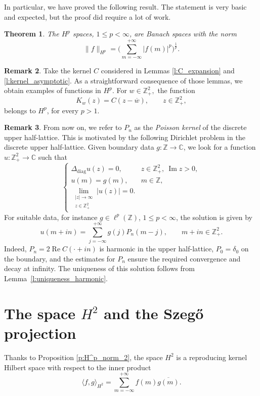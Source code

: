 \documentclass[12pt,a4paper,reqno]{amsart}
\newtheorem{thm}{Theorem}[section]
\theoremstyle{definition}
\newtheorem{rmk}[thm]{Remark}
\theoremstyle{definition}\newtheorem{defn}[thm]{Definition}
\begin{document}
    In particular, we have proved the following result. The statement is very basic and expected, but the proof did require a lot of work. 
    
    \begin{thm}\label{t:Hp_boundary_banach}
    The $H^p$ spaces, $1\leqslant p<\infty$,
    are Banach spaces with the norm
    \[
    \|f\|_{H^p}
    =
    \Big(\sum_{m=-\infty}^{+\infty}|f(m)|^p\Big)^{\frac 1p}.
    \]
    \end{thm}
    \begin{rmk}\label{Rmk:kernelsHp}
        Take the kernel $C$ considered in Lemmas \ref{l:C_expansion} and \ref{l:kernel_asymptotic}. As a straightforward consequence of those lemmas, we obtain examples of functions in $H^p$. For $w\in\mathbb{Z}^2_+,$ the function
        \[K_w(z)=C(z-\overline{w}), \qquad z\in\mathbb{Z}^2_+,\]
        belongs to $H^p$, for every $p>1.$
    \end{rmk}
    \begin{rmk}
    From now on, we refer to $P_n$ as the \emph{Poisson kernel} of the discrete upper half-lattice. This is motivated by the following Dirichlet problem in the
    discrete upper half-lattice. Given boundary data \(g:\mathbb Z\to\mathbb C\), we
    look for a function \(u:\mathbb Z^2_+\to\mathbb C\) such that
    \[
    \begin{cases}
    \Delta_{\mathrm{diag}}u(z)=0, & z\in\mathbb Z^2_+,\ \operatorname{Im}z>0,\\[4pt]
    u(m)=g(m), & m\in\mathbb Z,\\[4pt]
    \displaystyle \lim_{\substack{|z|\to\infty\\ z\in\mathbb Z^2_+}} |u(z)|=0.
    \end{cases}
    \]
    For suitable data, for instance \(g\in\ell^p(\mathbb Z)\), \(1\leqslant p<\infty\),
    the solution is given by
    \[
    u(m+in)
    =
    \sum_{j=-\infty}^{+\infty} g(j)P_n(m-j),
    \qquad m+in\in\mathbb Z^2_+.
    \]
    Indeed, \(P_n=2\operatorname{Re}C(\cdot+in)\) is harmonic in the upper
    half-lattice, \(P_0=\delta_0\) on the boundary, and the estimates for \(P_n\)
    ensure the required convergence and decay at infinity. The uniqueness of this
    solution follows from Lemma~\ref{l:uniqueness_harmonic}.
    \end{rmk} 
    
    \section{The space $H^2$ and the Szeg\H o projection} \label{s:H2}
    Thanks to Proposition \ref{p:H^p_norm_2}, the space $H^2$ is a reproducing kernel Hilbert space with respect to the inner product
    \[
    \langle f,g\rangle_{H^2}=\sum_{m=-\infty}^{+\infty}f(m)\overline{g(m)}.
    \]
    
\end{document}
